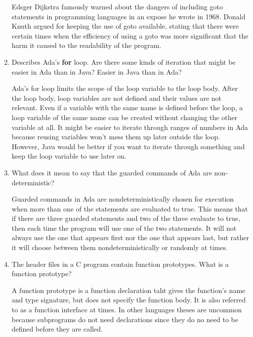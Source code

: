 \begin{enumerate}
  \begin{answer}
   Edsger Dijkstra famously warned about the dangers of including goto statements in programming languages in an expose he wrote in 1968. Donald Knuth argued for keeping the use of goto available, stating that there were certain times when the efficiency of using a goto was more significant that the harm it caused to the readability of the program.
  \end{answer}

  \item Describes Ada's \textbf{for} loop. Are there some
    kinds of iteration that might be easier in Ada than
    in Java? Easier in Java than in Ada?

  \begin{answer}
    Ada's for loop limits the scope of the loop variable to the loop body. After the loop body, loop variables are not defined and their values are not relevant. Even if a variable with the same name is defined before the loop, a loop variable of the same name can be created without changing the other variable at all. It might be easier to iterate through ranges of numbers in Ada because reusing variables won't mess them up later outside the loop. However, Java would be better if you want to iterate through something and keep the loop variable to use later on.
   
  \end{answer}

  \item What does it mean to say that the guarded commands
    of Ada are non-deterministic?

  \begin{answer}
    Guarded commands in Ada are nondeterministically chosen for execution when more than one of the statements are evaluated to true. This means that if there are three guarded statements and two of the three evaluate to true, then each time the program will use one of the two statements. It will not always use the one that appears first nor the one that appears last, but rather it will choose between them nondeterministically or randomly at times.
   
  \end{answer}

  \item The header files in a C program contain function
    prototypes. What is a function prototype?

  \begin{answer}
    A function prototype is a function declaration taht gives the function's name and type signature, but does not specify the function body. It is also referred to as a function interface at times. In other languages theses are uncommon because subprograms do not need declarations since they do no need to be defined before they are called. 
   

\end{answer}
\end{enumerate}
